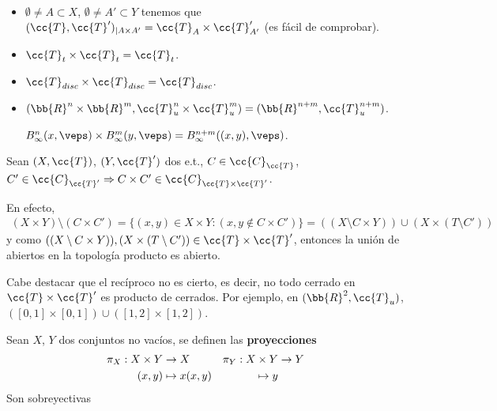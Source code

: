 \begin{ejemplo}\
    \begin{itemize}
        \item $\emptyset\neq A\subset X$, $\emptyset\neq A'\subset Y$ tenemos que $(\cc{T}, \cc{T}')_{|A\times A'}=\cc{T}_A \times \cc{T}_{A'}'$ (es fácil de comprobar).
        \item $\cc{T}_t\times \cc{T}_t = \cc{T}_t$.
        \item $\cc{T}_{disc}\times \cc{T}_{disc}=\cc{T}_{disc}$.
        \item $(\bb{R}^n\times \bb{R}^m, \cc{T}_u^n\times \cc{T}_u^m) = (\bb{R}^{n+m}, \cc{T}_u^{n+m})$.
        
        $B_{\infty}^n(x, \veps)\times B_{\infty}^m(y, \veps) = B_{\infty}^{n+m}((x,y), \veps)$.
    \end{itemize}
\end{ejemplo}

\begin{observacion}
    Sean $(X, \cc{T})$, $(Y, \cc{T}')$ dos e.t., $C\in \cc{C}_{\cc{T}}$, $C'\in \cc{C}_{\cc{T}'}\Rightarrow C\times C'\in \cc{C}_{\cc{T}\times \cc{T}'}$.


    En efecto, 
    \begin{gather*}
        (X\times Y)\setminus (C\times C')=\{(x,y)\in X\times Y : (x,y\notin C\times C')\} = ((X\setminus C \times Y)) \cup (X\times (T\setminus C'))
    \end{gather*}
    y como $((X\setminus C \times Y)), (X\times (T\setminus C')) \in \cc{T}\times \cc{T}'$, entonces la unión de abiertos en la topología producto es abierto. 

    Cabe destacar que el recíproco no es cierto, es decir, no todo cerrado en $\cc{T}\times \cc{T}'$ es producto de cerrados. Por ejemplo, en $(\bb{R}^2, \cc{T}_u)$, $([0,1]\times [0,1])\cup ([1,2] \times [1,2])$.

    \endsquare
\end{observacion}

\begin{definicion}
    Sean $X$, $Y$ dos conjuntos no vacíos, se definen las \textbf{proyecciones}
    \begin{align*}
        \pi_X:X\times Y &\to X \vspace*{1cm} &\pi_Y:X\times Y &\to Y\\
        (x,y) &\mapsto x  \vspace{1cm} (x,y) &\mapsto y
    \end{align*}
    Son sobreyectivas
    \endsquare
\end{definicion}

